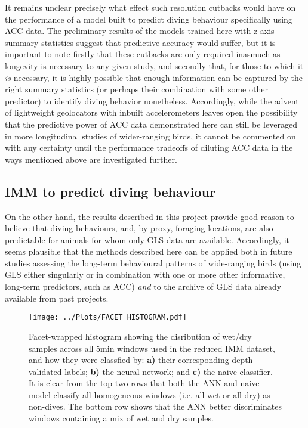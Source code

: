 \documentclass[11pt]{article}
\begin{document}
    It remains unclear precisely what effect such resolution cutbacks would have on the performance of a model built to predict diving behaviour specifically using ACC data. The preliminary results of the models trained here with z-axis summary statistics suggest that predictive accuracy would suffer, but it is important to note firstly that these cutbacks are only required inasmuch as longevity is necessary to any given study, and secondly that, for those to which it \emph{is} necessary, it is highly possible that enough information can be captured by the right summary statistics (or perhaps their combination with some other predictor) to identify diving behavior nonetheless. Accordingly, while the advent of lightweight geolocators with inbuilt accelerometers leaves open the possibility that the predictive power of ACC data demonstrated here can still be leveraged in more longitudinal studies of wider-ranging birds, it cannot be commented on with any certainty until the performance tradeoffs of diluting ACC data in the ways mentioned above are investigated further.
    
    \subsection{IMM to predict diving behaviour}
    On the other hand, the results described in this project provide good reason to believe that diving behaviours, and, by proxy, foraging locations, are also predictable for animals for whom only GLS data are available. Accordingly, it seems plausible that the methods described here can be applied both in future studies assessing the long-term behavioural patterns of wide-ranging birds (using GLS either singularly or in combination with one or more other informative, long-term predictors, such as ACC) \emph{and} to the archive of GLS data already available from past projects. 

    \begin{figure}[t!]
	    \centering\texttt{[image: ../Plots/FACET\_HISTOGRAM.pdf]}
	    \caption{Facet-wrapped histogram showing the disribution of wet/dry samples across all 5min windows used in the reduced IMM dataset, and how they were classfied by: \textbf{a)} their corresponding depth-validated labels; \textbf{b)} the neural network; and \textbf{c)} the naive classifier. It is clear from the top two rows that both the ANN and naive model classify all homogeneous windows (i.e. all wet or all dry) as non-dives. The bottom row shows that the ANN better discriminates windows containing a mix of wet and dry samples.}
    \end{figure}
    
\end{document}
